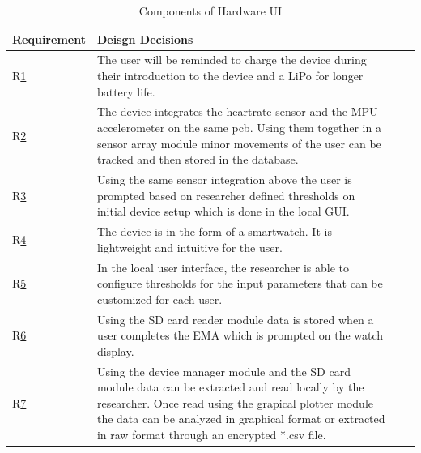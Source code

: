 \documentclass[12pt, titlepage]{article}
\begin{document}
\begin{table}[H]
	\begin{tabularx}{1.05\textwidth} { 
		  | >{\centering\arraybackslash}X 
		  | >{\centering\arraybackslash}X 
		  | >{\centering\arraybackslash}X 
		  | >{\centering\arraybackslash}X | }
		 \hline
		 \textbf{Requirement} & \textbf{Deisgn Decisions} \\
		\hline
		R\href{https://github.com/zakerl/Capstone_Project/blob/main/docs/SRS/SRS.pdf}{1}  & The user will be reminded to charge the device during their introduction to the device and a LiPo for longer battery life. \\		 
		\hline
		R\href{https://github.com/zakerl/Capstone_Project/blob/main/docs/SRS/SRS.pdf}{2} & The device integrates the heartrate sensor and the MPU accelerometer on the same pcb. Using them together in a sensor array module minor movements of the user can be tracked and then stored in the database. \\
		\hline
		 R\href{https://github.com/zakerl/Capstone_Project/blob/main/docs/SRS/SRS.pdf}{3} & Using the same sensor integration above the user is prompted based on researcher defined thresholds on initial device setup which is done in the local GUI. \\
		\hline
		R\href{https://github.com/zakerl/Capstone_Project/blob/main/docs/SRS/SRS.pdf}{4} & The device is in the form of a smartwatch. It is lightweight and intuitive for the user. \\
		\hline
		R\href{https://github.com/zakerl/Capstone_Project/blob/main/docs/SRS/SRS.pdf}{5} & In the local user interface, the researcher is able to configure thresholds for the input parameters that can be customized for each user. \\
		 \hline
		R\href{https://github.com/zakerl/Capstone_Project/blob/main/docs/SRS/SRS.pdf}{6}  & Using the SD card reader module data is stored when a user completes the EMA which is prompted on the watch display. \\
		\hline 
		 R\href{https://github.com/zakerl/Capstone_Project/blob/main/docs/SRS/SRS.pdf}{7}& Using the device manager module and the SD card module data can be extracted and read locally by the researcher. Once read using the grapical plotter module the data can be analyzed in graphical format or extracted in raw format through an encrypted *.csv file. \\
		\hline
	\end{tabularx}
\caption{\label{Hardware User Interface}Components of Hardware UI}  
\end{table}
\end{document}
